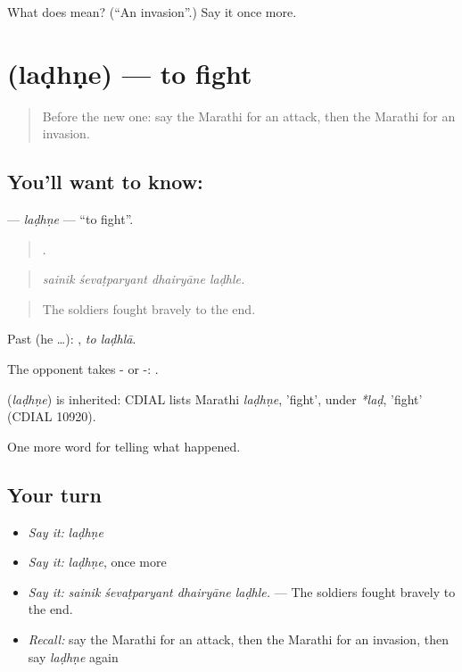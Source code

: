 \begin{tcolorbox}[breakable,colback=teal!4,colframe=teal!35!black,title={Before you move on}]
What does  mean? (\textquotedblleft{}An invasion\textquotedblright{}.) Say it once more.
\end{tcolorbox}
\section[\texorpdfstring{\mr{लढणे} (laḍhṇe)}{लढणे (laḍhṇe)}]{ (laḍhṇe) — to fight}

\label{lesson:MR-C328-ladhne}



\begin{quote}
Before the new one: say the Marathi for an attack, then the Marathi for an invasion.
\end{quote}

\subsection*{You'll want to know: }
\textbf{} — \emph{laḍhṇe} — \textquotedblleft{}to fight\textquotedblright{}.

\begin{quote}
   .
\end{quote}

\begin{quote}
\emph{sainik śevaṭparyant dhairyāne laḍhle.}
\end{quote}

\begin{quote}
The soldiers fought bravely to the end.
\end{quote}

Past (he …):  , \emph{to laḍhlā}.

The opponent takes - or -:  .

\begin{cousinweb}
\textbf{} (\emph{laḍhṇe}) is inherited: CDIAL lists Marathi \emph{laḍhṇe}, 'fight', under \emph{*laḍ}, 'fight' (CDIAL 10920).
\end{cousinweb}

\begin{grammarlens}[title={What you've built}]
One more word for telling what happened.
\end{grammarlens}

\subsection*{Your turn}
\begin{itemize}
\raggedright
  \item \emph{Say it:} \emph{laḍhṇe}
  \item \emph{Say it:} \emph{laḍhṇe}, once more
  \item \emph{Say it:} \emph{sainik śevaṭparyant dhairyāne laḍhle.} — The soldiers fought bravely to the end.
  \item \emph{Recall:} say the Marathi for an attack, then the Marathi for an invasion, then say \emph{laḍhṇe} again
\end{itemize}


